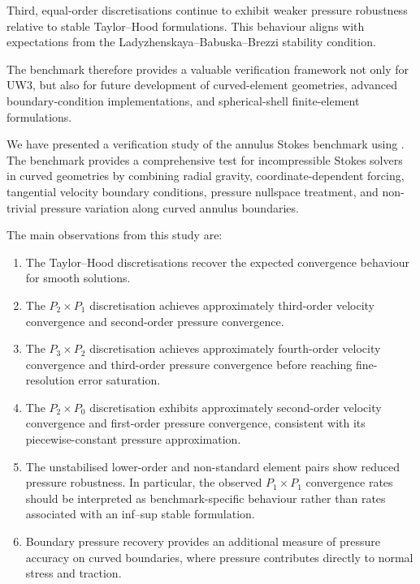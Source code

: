 \documentclass[gmd, manuscript]{copernicus}
\begin{document}
Third, equal-order discretisations continue to exhibit weaker pressure robustness relative to stable Taylor--Hood formulations.
This behaviour aligns with expectations from the Ladyzhenskaya--Babuska--Brezzi stability condition.

The benchmark therefore provides a valuable verification framework not only for UW3, but also for future development of curved-element 
geometries, advanced boundary-condition implementations, and spherical-shell finite-element formulations.

\conclusions

We have presented a verification study of the
 annulus Stokes benchmark using
. The benchmark provides a comprehensive test
for incompressible Stokes solvers in curved geometries by combining
radial gravity, coordinate-dependent forcing, tangential velocity
boundary conditions, pressure nullspace treatment, and non-trivial
pressure variation along curved annulus boundaries.

The main observations from this study are:
\begin{enumerate}
  \item The Taylor--Hood discretisations recover the expected
  convergence behaviour for smooth solutions.
  
  \item The \(P_2\times P_1\) discretisation achieves approximately
  third-order velocity convergence and second-order pressure
  convergence.
  
  \item The \(P_3\times P_2\) discretisation achieves approximately
  fourth-order velocity convergence and third-order pressure
  convergence before reaching fine-resolution error saturation.
  
  \item The \(P_2\times P_0\) discretisation exhibits approximately
  second-order velocity convergence and first-order pressure
  convergence, consistent with its piecewise-constant pressure
  approximation.
  
  \item The unstabilised lower-order and non-standard element pairs
  show reduced pressure robustness. In particular, the observed
  \(P_1\times P_1\) convergence rates should be interpreted as
  benchmark-specific behaviour rather than rates associated with an
  inf--sup stable formulation.
  
  \item Boundary pressure recovery provides an additional measure of
  pressure accuracy on curved boundaries, where pressure contributes
  directly to normal stress and traction.
\end{enumerate}
\end{document}
